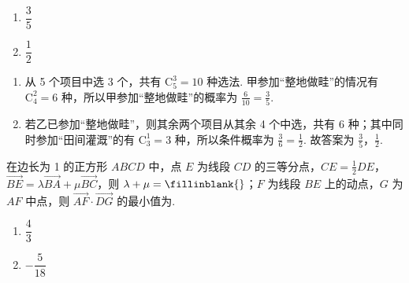 \begin{answer}
\begin{enumerate}
\item \(\dfrac35\)
\item \(\dfrac12\)
\end{enumerate}
\end{answer}

\begin{solution}
\begin{enumerate}
\item
从 5 个项目中选 3 个，共有
\(\mathrm{C}_5^3=10\)
种选法.
甲参加“整地做畦”的情况有
\(\mathrm{C}_4^2=6\)
种，所以甲参加“整地做畦”的概率为
\(\frac{6}{10}=\frac35\).

\item
若乙已参加“整地做畦”，则其余两个项目从其余 4 个中选，共有 6 种；其中同时参加“田间灌溉”的有
\(\mathrm{C}_3^1=3\)
种，所以条件概率为
\(\frac36=\frac12\).
故答案为 \(\frac35\)，\(\frac12\).
\end{enumerate}
\end{solution}

\begin{problem}
在边长为 1 的正方形 \(ABCD\) 中，点 \(E\) 为线段 \(CD\) 的三等分点，\(CE=\frac12DE\)，\(\overrightarrow{BE}=\lambda\overrightarrow{BA}+\mu\overrightarrow{BC}\)，则 \(\lambda+\mu=\fillinblank{}\)；\(F\) 为线段 \(BE\) 上的动点，\(G\) 为 \(AF\) 中点，则 \(\overrightarrow{AF}\cdot \overrightarrow{DG}\) 的最小值为\fillinblank{}.

\end{problem}

\begin{answer}
\begin{enumerate}
\item \(\dfrac43\)
\item \(-\dfrac{5}{18}\)
\end{enumerate}
\end{answer}

